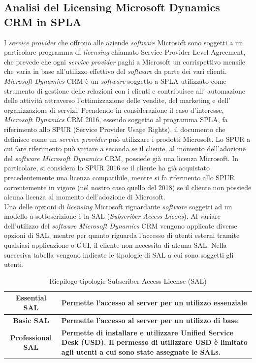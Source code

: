 \subsection{Analisi del Licensing Microsoft Dynamics CRM in SPLA}
I \emph{service provider} che offrono alle aziende \emph{software} Microsoft sono soggetti a un particolare programma di \emph{licensing} chiamato Service Provider Level Agreement, che prevede che ogni \emph{service provider} paghi a Microsoft un corrispettivo mensile che varia in base all'utilizzo effettivo del \emph{software} da parte dei vari clienti.
\emph{Microsoft Dynamics} CRM è un \emph{software} soggetto a SPLA utilizzato come strumento di gestione delle relazioni con i clienti e contribuisce all' automazione delle attività attraverso l’ottimizzazione delle vendite, del marketing e dell’ organizzazione di servizi.
Prendendo in considerazione il caso d'interesse, \emph{Microsoft Dynamics} CRM 2016, essendo soggetto al programma SPLA, fa riferimento allo SPUR (Service Provider Usage Rights), il documento che definisce come un \emph{service provider} può utilizzare i prodotti Microsoft.
Lo SPUR a cui fare riferimento può variare a seconda se il cliente, al momento dell’adozione del \emph{software} \emph{Microsoft Dynamics} CRM, possiede già una licenza Microsoft.
In particolare, si considera lo SPUR 2016 se il cliente ha già acquistato precedentemente una licenza compatibile, mentre si fa rifermento allo SPUR correntemente in vigore (nel nostro caso quello del 2018) se il cliente non possiede alcuna licenza al momento dell’adozione di Microsoft. \cite{microsoft-spur}
\\
Una delle opzioni di \emph{licensing} Microsoft riguardante \emph{software} soggetti ad un modello a sottoscrizione è la SAL (\emph{Subscriber Access Licens}). 
Al variare dell’utilizzo del \emph{software} \emph{Microsoft Dynamics} CRM vengono applicate diverse opzioni di SAL, mentre per quanto riguarda l’accesso di utenti esterni tramite qualsiasi applicazione o GUI, il cliente non
necessita di alcuna SAL.
Nella succesiva tabella vengono indicate le tipologie di SAL a cui sono soggetti gli utenti. \cite{microsoft-sal}
\begin{table}[H]
\begin{tabularx}{\textwidth}{|a|X|}
	\hline
	\textbf{Essential SAL} & \textbf{Permette l’accesso al server per un utilizzo essenziale} \\\hline
	\textbf{Basic SAL} & \textbf{Permette l’accesso al server per un utilizzo di base} \\
    \hline
    \textbf{Professional SAL} & \textbf{Permette di installare e utilizzare Unified Service Desk (USD). Il permesso
di utilizzare USD è limitato agli utenti a cui sono state assegnate le SALs.} \\ \hline 
   
\end{tabularx}
    \caption {Riepilogo tipologie Subscriber Access License (SAL) \label{fig:tableSAL}}	
\end{table}

